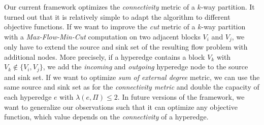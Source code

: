 Our current framework optimizes the \emph{connectivity} metric of a $k$-way partition.
It turned out that it is relatively simple to adapt the algorithm to different objective
functions. If we want to improve the \emph{cut} metric of a $k$-way partition with a 
\emph{Max-Flow-Min-Cut} computation on two adjacent blocks $V_i$ and $V_j$, we only have to extend the
source and sink set of the resulting flow problem with additional nodes. More precisely,
if a hyperedge contains a block $V_k$ with $V_k \notin \{V_i,V_j\}$, we add the
\emph{incoming} and \emph{outgoing} hyperedge node to the source and sink set.
If we want to optimize \emph{sum of external degree} metric, we can use the same source and
sink set as for the \emph{connectivity metric} and double the capacity of each hyperedge $e$
with $\lambda(e,\Pi) \le 2$. In future versions of the framework, we want to
generalize our observations such that it can optimize any objective function, which value depends
on the \emph{connectivity} of a hyperedge.

